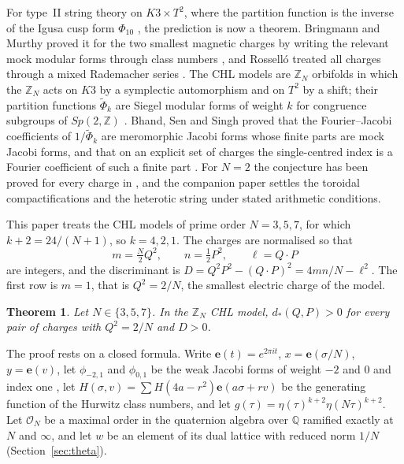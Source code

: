 \documentclass[11pt]{amsart}
\numberwithin{equation}{section}
\theoremstyle{plain}
\newtheorem{thm}{Theorem}[section]
\theoremstyle{remark}
\newcommand{\Z}{\mathbb{Z}}
\newcommand{\Q}{\mathbb{Q}}
\newcommand{\cO}{\mathcal{O}}
\newcommand{\e}{\mathbf{e}}
\newcommand{\pmi}{\phi_{-2,1}}
\newcommand{\pz}{\phi_{0,1}}
\newcommand{\tPhi}{\widetilde{\Phi}}
\begin{document}
For type~II string theory on $K3\times T^2$, where the partition function is the inverse of the Igusa cusp form $\Phi_{10}$ \cite{DVV97}, the prediction is now a theorem. Bringmann and Murthy proved it for the two smallest magnetic charges by writing the relevant mock modular forms through class numbers \cite{BM13}, and Rossell\'o treated all charges through a mixed Rademacher series \cite{Ros24}. The CHL models \cite{CHL95} are $\Z_N$ orbifolds in which the $\Z_N$ acts on $K3$ by a symplectic automorphism and on $T^2$ by a shift; their partition functions $\tPhi_k$ are Siegel modular forms of weight $k$ for congruence subgroups of $Sp(2,\Z)$ \cite{JS06,DJS06}. Bhand, Sen and Singh proved that the Fourier--Jacobi coefficients of $1/\tPhi_k$ are meromorphic Jacobi forms whose finite parts are mock Jacobi forms, and that on an explicit set of charges the single-centred index is a Fourier coefficient of such a finite part \cite{BSS25}. For $N=2$ the conjecture has been proved for every charge in \cite{Bha26a}, and the companion paper \cite{Bha26b} settles the toroidal compactifications and the heterotic string under stated arithmetic conditions.

This paper treats the CHL models of prime order $N=3,5,7$, for which $k+2=24/(N+1)$, so $k=4,2,1$. The charges are normalised so that
\begin{equation}\label{eq:charges}
m=\tfrac{N}{2}Q^2,\qquad n=\tfrac12P^2,\qquad \ell=Q\cdot P
\end{equation}
are integers, and the discriminant is $D=Q^2P^2-(Q\cdot P)^2=4mn/N-\ell^2$. The first row is $m=1$, that is $Q^2=2/N$, the smallest electric charge of the model.

\begin{thm}\label{thm:main}
Let $N\in\{3,5,7\}$. In the $\Z_N$ CHL model, $d_*(Q,P)>0$ for every pair of charges with $Q^2=2/N$ and $D>0$.
\end{thm}

The proof rests on a closed formula. Write $\e(t)=e^{2\pi i t}$, $x=\e(\sigma/N)$, $y=\e(v)$, let $\pmi$ and $\pz$ be the weak Jacobi forms of weight $-2$ and $0$ and index one \cite[\S9]{EZ85}, let $H(\sigma,v)=\sum H(4a-r^2)\e(a\sigma+rv)$ be the generating function of the Hurwitz class numbers, and let $g(\tau)=\eta(\tau)^{k+2}\eta(N\tau)^{k+2}$. Let $\cO_N$ be a maximal order in the quaternion algebra over $\Q$ ramified exactly at $N$ and $\infty$, and let $w$ be an element of its dual lattice with reduced norm $1/N$ (Section~\ref{sec:theta}).
\end{document}
